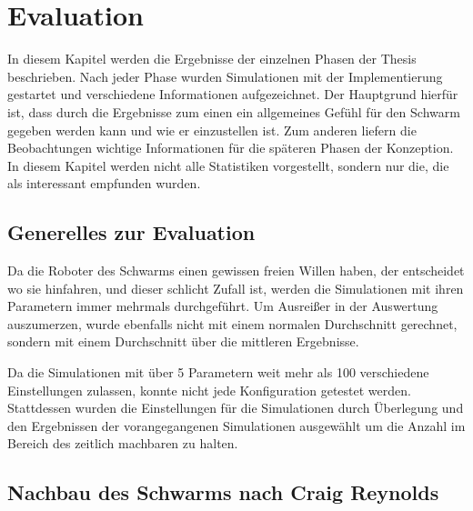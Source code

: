 \chapter{Evaluation}\label{ch:Evaluation}

In diesem Kapitel werden die Ergebnisse der einzelnen Phasen der Thesis beschrieben. Nach jeder Phase wurden Simulationen mit der Implementierung gestartet und verschiedene Informationen aufgezeichnet. Der Hauptgrund hierfür ist, dass durch die Ergebnisse zum einen ein allgemeines Gefühl für den Schwarm gegeben werden kann und wie er einzustellen ist. Zum anderen liefern die Beobachtungen wichtige Informationen für die späteren Phasen der Konzeption.
In diesem Kapitel werden nicht alle Statistiken vorgestellt, sondern nur die, die als interessant empfunden wurden.

\section{Generelles zur Evaluation}

Da die Roboter des Schwarms einen gewissen freien Willen haben, der entscheidet wo sie hinfahren, und dieser schlicht Zufall ist, werden die Simulationen mit ihren Parametern immer mehrmals durchgeführt. Um Ausreißer in der Auswertung auszumerzen, wurde ebenfalls nicht mit einem normalen Durchschnitt gerechnet, sondern mit einem Durchschnitt über die mittleren Ergebnisse.

Da die Simulationen mit über 5 Parametern weit mehr als 100 verschiedene Einstellungen zulassen, konnte nicht jede Konfiguration getestet werden. Stattdessen wurden die Einstellungen für die Simulationen durch Überlegung und den Ergebnissen der vorangegangenen Simulationen ausgewählt um die Anzahl im Bereich des zeitlich machbaren zu halten.

\section{Nachbau des Schwarms nach Craig Reynolds}

